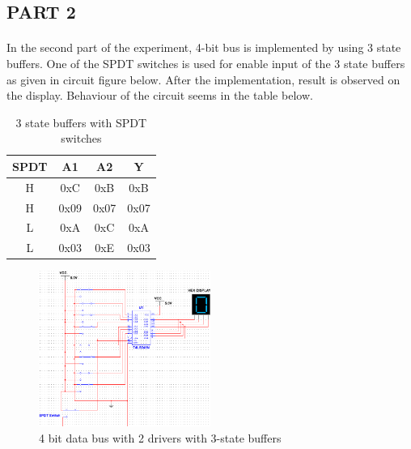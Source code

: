 \documentclass[pdftex,12pt,a4paper]{article}
\begin{document}
\begin{flushleft}
\subsection{PART 2}

\paragraph{}
In the second part of the experiment, 4-bit bus is implemented by using 3 state buffers. One of the SPDT switches is used for enable input of the 3 state buffers as given in circuit figure below. After the implementation, result is observed on the display. Behaviour of the circuit seems in the table below.

\begin{table}[]
    \centering
    \begin{tabular}{|c|c|c|c|}
        \hline
         SPDT & A1   & A2   & Y \\ \hline
         H    & 0xC  & 0xB  & 0xB \\ \hline
         H    & 0x09  & 0x07  & 0x07 \\ \hline
         L    & 0xA  & 0xC  & 0xA \\ \hline
         L    & 0x03  & 0xE  & 0x03 \\ \hline
    \end{tabular}
    \caption{3 state buffers with SPDT switches}
    \label{tab:my_label}
\end{table}

\begin{figure}[h]
	\centering
	\includegraphics[width=0.5\textwidth]{part2.png}	
	\caption{4 bit data bus with 2 drivers with 3-state buffers}
	\label{circ:part2}
\end{figure}
\end{flushleft}
\end{document}
